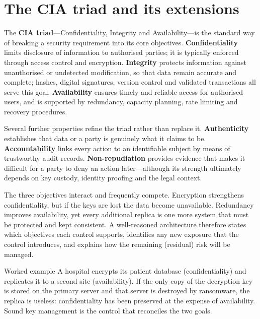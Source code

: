 \section{The CIA triad and its extensions}\label{sec:1.2}
The \textbf{CIA triad}—Confidentiality, Integrity and Availability—is the standard way of breaking a security requirement into its core objectives. \textbf{Confidentiality} limits disclosure of information to authorised parties; it is typically enforced through access control and encryption. \textbf{Integrity} protects information against unauthorised or undetected modification, so that data remain accurate and complete; hashes, digital signatures, version control and validated transactions all serve this goal. \textbf{Availability} ensures timely and reliable access for authorised users, and is supported by redundancy, capacity planning, rate limiting and recovery procedures.

Several further properties refine the triad rather than replace it. \textbf{Authenticity} establishes that data or a party is genuinely what it claims to be. \textbf{Accountability} links every action to an identifiable subject by means of trustworthy audit records. \textbf{Non-repudiation} provides evidence that makes it difficult for a party to deny an action later—although its strength ultimately depends on key custody, identity proofing and the legal context.

The three objectives interact and frequently compete. Encryption strengthens confidentiality, but if the keys are lost the data become unavailable. Redundancy improves availability, yet every additional replica is one more system that must be protected and kept consistent. A well-reasoned architecture therefore states which objectives each control supports, identifies any new exposure that the control introduces, and explains how the remaining (residual) risk will be managed.

\begin{examplebox}{Worked example}
A hospital encrypts its patient database (confidentiality) and replicates it to a second site (availability). If the only copy of the decryption key is stored on the primary server and that server is destroyed by ransomware, the replica is useless: confidentiality has been preserved at the expense of availability. Sound key management is the control that reconciles the two goals.
\end{examplebox}

